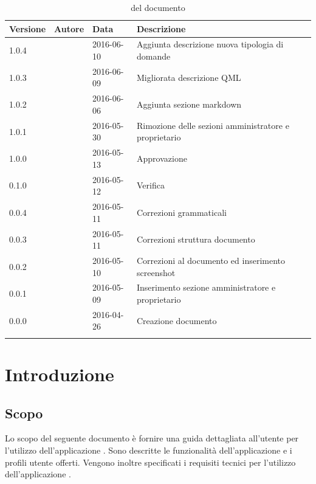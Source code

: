 \documentclass[12pt,a4paper]{article}
\begin{document}
	\begin{center}
		\begin{longtable}[H]{p{} p{} p{} p{}}
			\toprule
			\textbf{Versione}	&	\textbf{Autore}	&	\textbf{Data}	&	\textbf{Descrizione}\\*		
			\midrule
			1.0.4 & \TP{} & 2016-06-10 & Aggiunta descrizione nuova tipologia di domande \\*	
			\midrule
			1.0.3 & \TP{} & 2016-06-09 & Migliorata descrizione QML \\*	
			\midrule
			1.0.2 & \WS{} & 2016-06-06 &  Aggiunta sezione markdown \\*	
			\midrule	
			1.0.1 & \AB{} & 2016-05-30 &  Rimozione delle sezioni amministratore e proprietario\\*		
			\midrule
			1.0.0 & \AVE{} & 2016-05-13 &  Approvazione \\*			
			\midrule
			0.1.0 & \TP{} & 2016-05-12 &  Verifica \\*
			\midrule
			0.0.4 & \WS{} & 2016-05-11 &  Correzioni grammaticali \\*
			\midrule
			0.0.3 & \WS{} & 2016-05-11 &  Correzioni struttura documento \\*
			\midrule
			0.0.2 & \WS{} & 2016-05-10 &  Correzioni al documento ed inserimento screenshot \\*
			\midrule
			0.0.1 & \WS{} & 2016-05-09 &  Inserimento sezione amministratore e proprietario \\*
			\midrule
			0.0.0 & \AB{} & 2016-04-26 &  Creazione documento \\*
			\bottomrule
			\caption{\mGls{versionamento}  del documento}
			\label{tabVers1}
		\end{longtable}
	\end{center}
	
	\newpage
	\tableofcontents
	\newpage
	\listoftables
	\listoffigures
	\newpage
	
	
	\section{Introduzione}	\label{intro}
	
	\subsection{Scopo}
	Lo scopo del seguente documento è fornire una guida dettagliata all’utente per l’utilizzo dell’applicazione \prj{}. Sono descritte le funzionalità dell'applicazione e i profili utente offerti.
	Vengono inoltre specificati i requisiti tecnici per l'utilizzo dell'applicazione \prj{}.
\end{document}
